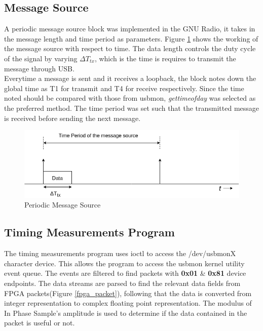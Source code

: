 \documentclass{kththesis}
\begin{document}
\subsection{Message Source} \label{message_source}
A periodic message source block was implemented in the GNU Radio, it takes in the message length and time period as parameters. Figure \ref{message_source} shows the working of the message source with respect to time. The data length controls the duty cycle of the signal by varying $\Delta T_{tx}$, which is the time is requires to transmit the message through USB.\\

Everytime a message is sent and it receives a loopback, the block notes down the global time as T1 for transmit and T4 for receive respectively. Since the time noted should be compared with those from usbmon, \textit{gettimeofday} was selected as the preferred method. The time period was set such that the transmitted message is received before sending the next message.\\

\begin{figure}[h!]
\centering
\includegraphics[width=\textwidth]{Figure/Message_Source.png}
\caption{Periodic Message Source}
\label{message_source}
\end{figure}
\subsection{Timing Measurements Program}
The timing measurements program uses ioctl to access the /dev/usbmonX character device. This allows the program to access the usbmon kernel utility event queue. The events are filtered to find packets with \textbf{0x01} \& \textbf{0x81} device endpoints. The data streams are parsed to find the relevant data fields from FPGA packets(Figure \ref{fpga_packet}), following that the data is converted from integer representation to complex floating point representation. The modulus of In Phase Sample's amplitude is used to determine if the data contained in the packet is useful or not. 
\end{document}
